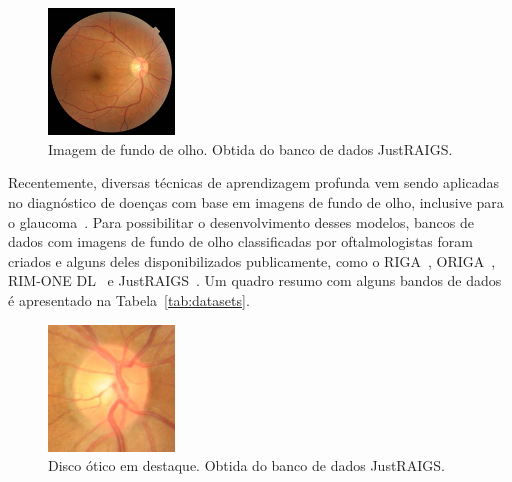 \documentclass[12pt]{article}
\begin{document}
\begin{figure}[htb]
 \centering
 \includegraphics[width=0.3\textwidth]{images/TRAIN000004_cut.JPG}
 \caption{Imagem de fundo de olho. Obtida do banco de dados JustRAIGS.}
 \label{fig:fundus}
\end{figure}

Recentemente, diversas técnicas de aprendizagem profunda vem sendo aplicadas no diagnóstico de doenças com base em imagens de fundo de olho, inclusive para o glaucoma~\cite{li_review_2021}. Para possibilitar o desenvolvimento desses modelos, bancos de dados com imagens de fundo de olho classificadas por oftalmologistas foram criados e alguns deles disponibilizados publicamente, como o RIGA~\cite{riga}, ORIGA~\cite{origa}, RIM-ONE DL~\cite{RIMONEDL} e JustRAIGS~\cite{justraigs}. Um quadro resumo com alguns bandos de dados é apresentado na Tabela~\ref{tab:datasets}. 

\begin{figure}[htb]
 \centering
 \includegraphics[width=0.3\textwidth]{images/disk.jpg}
 \caption{Disco ótico em destaque. Obtida do banco de dados JustRAIGS.}
 \label{fig:disk}
\end{figure}
\end{document}
